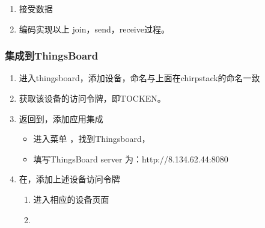 \documentclass[a4paper,12pt,english]{sphinxmanual}
\begin{document}
{{\begin{enumerate}
\begin{enumerate}
\item {} 
\sphinxAtStartPar
例如：

\end{enumerate}

\item {} 
\sphinxAtStartPar
接受数据

\sphinxAtStartPar
{}

\item {} 
\sphinxAtStartPar
编码实现以上 join，send，receive过程。

\end{enumerate}


\subsubsection{集成到ThingsBoard}
\label{\detokenize{exp-lora/lorawan-esp32:thingsboard}}\begin{enumerate}
%
\item {} 
\sphinxAtStartPar
进入thingsboard，添加设备，命名与上面在chirpstack的命名一致

\item {} 
\sphinxAtStartPar
获取该设备的访问令牌，即TOCKEN。

\item {} 
\sphinxAtStartPar
返回到，添加应用集成
\begin{itemize}
\item {} 
\sphinxAtStartPar
进入菜单 ，找到Thingsboard，

\item {} 
\sphinxAtStartPar
填写ThingsBoard server 为：http://8.134.62.44:8080

\end{itemize}

\item {} 
\sphinxAtStartPar
在，添加上述设备访问令牌
\begin{enumerate}
%
\item {} 
\sphinxAtStartPar
进入相应的设备页面

\item {} 
\sphinxAtStartPar
{}


\end{enumerate}
\end{enumerate}}}
\end{document}
